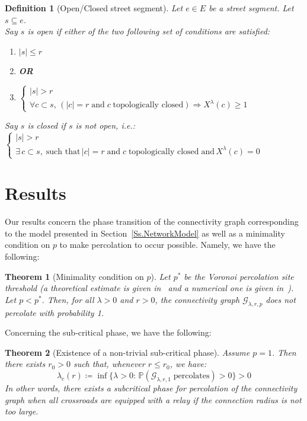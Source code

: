 \documentclass[11pt,a4paper]{amsart}
\theoremstyle{exampstyle}
\newtheorem{Theorem}{Theorem}
\newtheorem{Definition}{Definition}
\theoremstyle{exampnotations}
\begin{document}
\begin{Definition}[Open/Closed street segment]
Let $e \in E$ be a street segment. Let $s \subseteq e$.  \\ Say $s$ is \emph{open} if either of the two following set of conditions are satisfied:
\begin{enumerate}
\item $\vert s \vert \leq r$
\vspace{.2 cm}
\item[]\textbf{OR}
\vspace{.2 cm}
\item $\left\{
\begin{array}{l}
\vert s \vert > r \\
\forall c \subset s, \, (\vert c \vert = r \; \text{and} \; c  \; \text{topologically closed} )\Rightarrow X^{\lambda}(c) \geq 1
\end{array}
\right.$
\end{enumerate}
Say $s$ is \emph{closed} if $s$ is not open, i.e.: \\
 $\left\{
\begin{array}{l}
\vert s \vert > r \\
\exists \, c \subset s, \; \text{such that} \, \vert c \vert = r \; \text{and} \; c  \; \text{topologically closed} \; \text{and} \,  X^{\lambda}(c) = 0
\end{array}
\right.$
\end{Definition}

\section{Results}
Our results concern the phase transition of the connectivity graph corresponding to the model presented in Section~\ref{Ss.NetworkModel} as well as a minimality condition on $p$ to make percolation to occur possible. Namely, we have the following:

\begin{Theorem}[Minimality condition on $p$]
\label{Thm.minimality}
Let $p^{*}$ be the Voronoi percolation site threshold (a theoretical estimate is given in~\cite{neher2008topological} and a numerical one is given in~\cite{becker_percolation_2009}). Let $p < p^*$. Then, for all $\lambda > 0$ and $r >0$, the connectivity graph $\mathcal{G}_{\lambda,r,p}$ does not percolate with probability 1.
\end{Theorem}

Concerning the sub-critical phase, we have the following:
\begin{Theorem}[Existence of a non-trivial sub-critical phase]
\label{Thm.subcritical}
Assume $p=1$. Then there exists $r_{0} > 0$ such that, whenever $r \leq r_0$, we have:
\begin{equation*}
    \lambda_c(r) \coloneqq \inf \lbrace \lambda > 0 : \, \mathbb{P}(\mathcal{G}_{\lambda, r, 1} \; \text{percolates}) > 0 \rbrace > 0
\end{equation*}
In other words, there exists a subcritical phase for percolation of the connectivity graph when all crossroads are equipped with a relay if the connection radius is not too large.
\end{Theorem}
\end{document}

